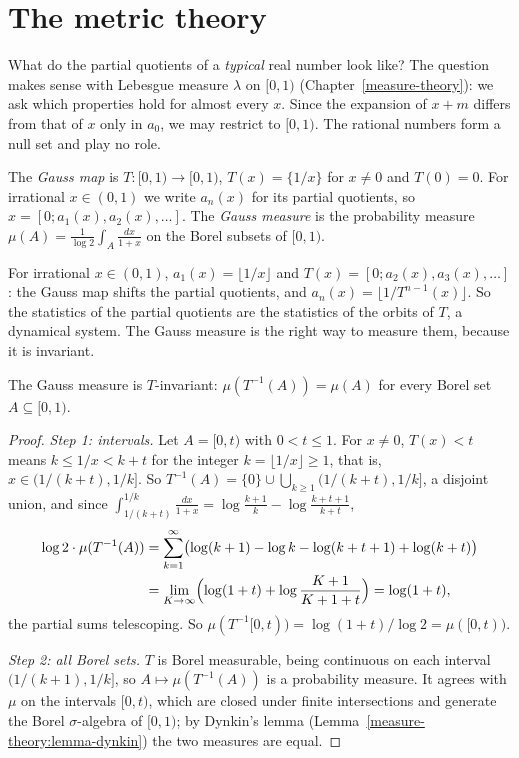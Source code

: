 \section{The metric theory}\label{continued-fractions:section-metric}

What do the partial quotients of a \emph{typical} real number look like? The question makes sense with Lebesgue measure $\lambda$ on $[0, 1)$ (Chapter~\ref{measure-theory}): we ask which properties
hold for almost every $x$. Since the expansion of $x + m$ differs from that of $x$ only in $a_0$, we may restrict to $[0, 1)$. The rational numbers form a null set and play no role.

\begin{definition}\label{continued-fractions:definition-gauss-map}
The \emph{Gauss map} is $T \colon [0, 1) \to [0, 1)$, $T(x) = \{1/x\}$ for $x \neq 0$ and $T(0) = 0$. For irrational $x \in (0, 1)$ we write $a_n(x)$ for its partial quotients, so
$x = [0; a_1(x), a_2(x), \ldots]$. The \emph{Gauss measure} is the probability measure $\mu(A) = \frac{1}{\log 2}\int_A\frac{dx}{1 + x}$ on the Borel subsets of $[0, 1)$.
\end{definition}

For irrational $x \in (0, 1)$, $a_1(x) = \lfloor 1/x \rfloor$ and $T(x) = [0; a_2(x), a_3(x), \ldots]$: the Gauss map shifts the partial quotients, and $a_n(x) = \lfloor 1/T^{n-1}(x) \rfloor$. So the
statistics of the partial quotients are the statistics of the orbits of $T$, a dynamical system. The Gauss measure is the right way to measure them, because it is invariant.

\begin{theorem}[Gauss]\label{continued-fractions:theorem-gauss-measure}
The Gauss measure is $T$-invariant: $\mu(T^{-1}(A)) = \mu(A)$ for every Borel set $A \subseteq [0, 1)$.
\end{theorem}

\begin{proof}
\emph{Step 1: intervals.} Let $A = [0, t)$ with $0 < t \leq 1$. For $x \neq 0$, $T(x) < t$ means $k \leq 1/x < k + t$ for the integer $k = \lfloor 1/x \rfloor \geq 1$, that is, $x \in (1/(k + t), 1/k]$.
So $T^{-1}(A) = \{0\} \cup \bigcup_{k \geq 1}(1/(k + t), 1/k]$, a disjoint union, and since $\int_{1/(k+t)}^{1/k}\frac{dx}{1 + x} = \log\frac{k + 1}{k} - \log\frac{k + t + 1}{k + t}$,
\[
\begin{aligned}
\log 2 \cdot \mu(T^{-1}(A)) &= \sum_{k=1}^\infty\bigl(\log(k + 1) - \log k - \log(k + t + 1) + \log(k + t)\bigr)\\
&= \lim_{K \to \infty}\Bigl(\log(1 + t) + \log\frac{K + 1}{K + 1 + t}\Bigr) = \log(1 + t),
\end{aligned}
\]
the partial sums telescoping. So $\mu(T^{-1}[0, t)) = \log(1 + t)/\log 2 = \mu([0, t))$.

\emph{Step 2: all Borel sets.} $T$ is Borel measurable, being continuous on each interval $(1/(k + 1), 1/k]$, so $A \mapsto \mu(T^{-1}(A))$ is a probability measure. It agrees with $\mu$ on the
intervals $[0, t)$, which are closed under finite intersections and generate the Borel $\sigma$-algebra of $[0, 1)$; by Dynkin's lemma (Lemma~\ref{measure-theory:lemma-dynkin}) the two measures are equal.
\end{proof}

